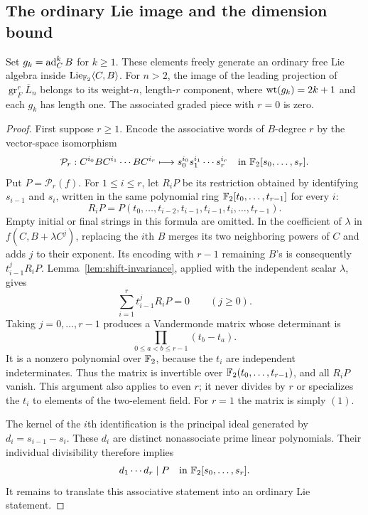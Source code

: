 \subsection{The ordinary Lie image and the dimension bound}
\begin{proposition}
\label{prop:image-bound}
Set $g_k=\operatorname{ad}_C^kB$ for $k\geq1$.
These elements freely generate an ordinary free Lie algebra inside
$\operatorname{Lie}_{{\mathbb F_2}}\langle C,B\rangle$.
For $n>2$, the image of the leading projection of
$\operatorname{gr}^r_F\overline L_n$ belongs to its weight-$n$,
length-$r$ component, where $\operatorname{wt}(g_k)=2k+1$ and each $g_k$ has
length one.
The associated graded piece with $r=0$ is zero.
\end{proposition}

\begin{proof}
First suppose $r\geq1$.
Encode the associative words of $B$-degree $r$ by the vector-space
isomorphism
\[
 \mathcal P_r:
 C^{i_0}BC^{i_1}\cdots BC^{i_r}
 \longmapsto s_0^{i_0}s_1^{i_1}\cdots s_r^{i_r}
 \quad\text{in }{\mathbb F_2}[s_0,\ldots,s_r].
\]
Put $P=\mathcal P_r(f)$.
For $1\leq i\leq r$, let $R_iP$ be its restriction obtained by
identifying $s_{i-1}$ and $s_i$, written in the same polynomial
ring ${\mathbb F_2}[t_0,\ldots,t_{r-1}]$ for every $i$:
\[
 R_iP=P(t_0,\ldots,t_{i-2},t_{i-1},t_{i-1},
               t_i,\ldots,t_{r-1}).
\]
Empty initial or final strings in this formula are omitted.
In the coefficient of $\lambda$ in $f(C,B+\lambda C^j)$, replacing
the $i$th $B$ merges its two neighboring powers of $C$ and adds
$j$ to their exponent.  Its encoding with $r-1$ remaining $B$'s
is consequently $t_{i-1}^{j}R_iP$.
Lemma~\ref{lem:shift-invariance}, applied with the independent
scalar $\lambda$, gives
\begin{equation}
 \label{eq:vandermonde-system}
 \sum_{i=1}^r t_{i-1}^{j}R_iP=0\qquad(j\geq0).
\end{equation}
Taking $j=0,\ldots,r-1$ produces a Vandermonde matrix whose
determinant is
\[
 \prod_{0\leq a<b\leq r-1}(t_b-t_a).
\]
It is a nonzero polynomial over ${\mathbb F_2}$, because the $t_i$ are
independent indeterminates.  Thus the matrix is invertible over
${\mathbb F_2}(t_0,\ldots,t_{r-1})$, and all $R_iP$ vanish.
This argument also applies to even $r$; it never divides by $r$
or specializes the $t_i$ to elements of the two-element field.
For $r=1$ the matrix is simply $(1)$.

The kernel of the $i$th identification is the principal ideal
generated by $d_i=s_{i-1}-s_i$.
These $d_i$ are distinct nonassociate prime linear polynomials.
Their individual divisibility therefore implies
\begin{equation}
 \label{eq:consecutive-divisibility}
 d_1\cdots d_r\mid P
 \quad\text{in }{\mathbb F_2}[s_0,\ldots,s_r].
\end{equation}
It remains to translate this associative statement into an
ordinary Lie statement.


\end{proof}
